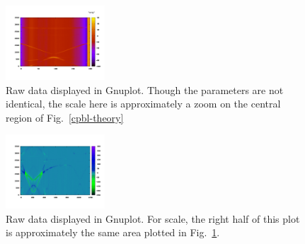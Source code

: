 \documentclass[twocolumn]{revtex4}
\newcommand{\figwidth}{0.33\textwidth}
\begin{document}
\begin{figure} 
\includegraphics[width=\figwidth]{colorful-data.png}
\caption{ Raw data displayed in Gnuplot. Though the parameters are not
identical, the scale here is approximately a zoom on the central
region of Fig.~\ref{cpbl-theory}}
\label{raw-1}
\end{figure}

\begin{figure}
\includegraphics[width=\figwidth]{CPBL-color.png}
\caption{ Raw data displayed in Gnuplot. For scale, the right half of
  this plot is approximately the same area plotted in
  Fig.~\ref{raw-1}. }
\label{raw-2}
\end{figure}
\end{document}
